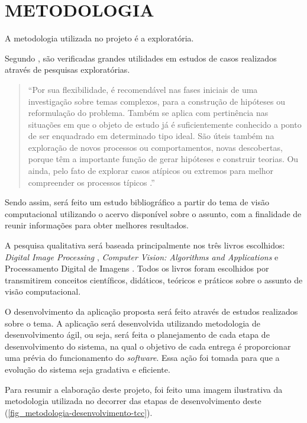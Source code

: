 \chapter{\textbf{METODOLOGIA}}

A metodologia utilizada no projeto é a exploratória.

Segundo , são verificadas grandes utilidades em estudos de casos realizados através de pesquisas exploratórias.

\begin{quotation}
“Por sua flexibilidade, é recomendável nas fases iniciais de uma investigação sobre temas complexos, para a construção de hipóteses ou reformulação do problema. Também se aplica com pertinência nas situações em que o objeto de estudo já é suficientemente conhecido a ponto de ser enquadrado em determinado tipo ideal. São úteis também na exploração de novos processos ou comportamentos, novas descobertas, porque têm a importante função de gerar hipóteses e construir teorias. Ou ainda, pelo fato de explorar casos atípicos ou extremos para melhor compreender os processos típicos \cite{VENTURA2007}.”
\end{quotation}

Sendo assim, será feito um estudo bibliográfico a partir do tema de visão computacional utilizando o acervo disponível sobre o assunto, com a finalidade de reunir informações para obter melhores resultados.

A pesquisa qualitativa será baseada principalmente nos três livros escolhidos: \textit{Digital Image Processing} \cite{GONZALEZ2002},  \textit{Computer Vision: Algorithms and Applications} \cite{SZELISKI2010} e Processamento Digital de Imagens \cite{FILHO1999}. Todos os livros foram escolhidos por transmitirem conceitos científicos, didáticos, teóricos e práticos sobre o assunto de visão computacional.

O desenvolvimento da aplicação proposta será feito através de estudos realizados sobre o tema. A aplicação será desenvolvida utilizando metodologia de desenvolvimento ágil, ou seja, será feita o planejamento de cada etapa de desenvolvimento do sistema, na qual o objetivo de cada entrega é proporcionar uma prévia do funcionamento do \textit{software}. Essa ação foi tomada para que a evolução do sistema seja gradativa e eficiente.

Para resumir a elaboração deste projeto, foi feito uma imagem ilustrativa da metodologia utilizada no decorrer das etapas de desenvolvimento deste (\autoref{fig_metodologia-desenvolvimento-tcc}).

